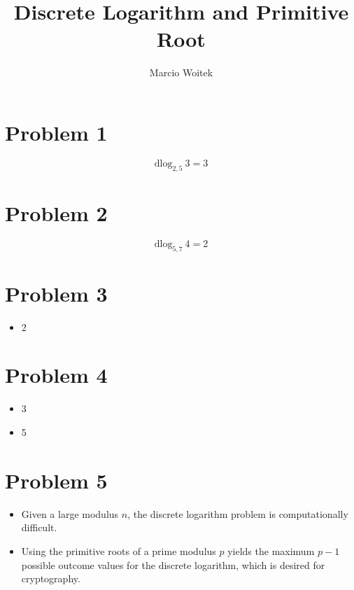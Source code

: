 \documentclass[11pt]{article}
\author{Marcio Woitek}
\date{}
\title{Discrete Logarithm and Primitive Root}
\newcommand{\dlog}[3]{\mathrm{dlog}_{#2,#3}\:#1}
\begin{document}
\maketitle
\thispagestyle{empty}
\pagestyle{empty}

\section*{Problem 1}
\label{sec:org45c2690}
\begin{equation}
\dlog{3}{2}{5}=3
\end{equation}

\section*{Problem 2}
\label{sec:org2f08df2}
\begin{equation}
\dlog{4}{5}{7}=2
\end{equation}

\section*{Problem 3}
\label{sec:org19581df}
\begin{itemize}
\item 2
\end{itemize}

\section*{Problem 4}
\label{sec:org6d62e76}
\begin{itemize}
\item 3
\item 5
\end{itemize}

\section*{Problem 5}
\label{sec:org28488b7}
\begin{itemize}
\item Given a large modulus \(n\), the discrete logarithm problem is computationally
difficult.
\item Using the primitive roots of a prime modulus \(p\) yields the maximum \(p-1\)
possible outcome values for the discrete logarithm, which is desired for
cryptography.
\end{itemize}
\end{document}
